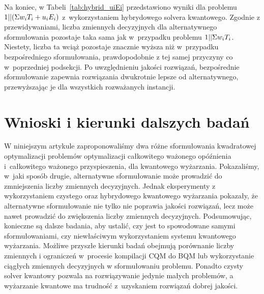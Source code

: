 Na koniec, w Tabeli~\ref{tab:hybrid_uiEi} przedstawiono wyniki dla problemu $1||(\Sigma{}w_i T_i+u_i E_i)$ z~wykorzystaniem hybrydowego solvera kwantowego. Zgodnie z przewidywaniami, liczba zmiennych decyzyjnych dla alternatywnego sformułowania pozostaje taka sama jak w~przypadku problemu $1||\Sigma{}w_i T_i$. Niestety, liczba ta wciąż pozostaje znacznie wyższa niż w~przypadku bezpośredniego sformułowania, prawdopodobnie z tej samej przyczyny co w~poprzedniej podsekcji. Po uwzględnieniu jakości rozwiązań, bezpośrednie sformułowanie zapewnia rozwiązania dwukrotnie lepsze od alternatywnego, przewyższając je dla wszystkich rozważanych instancji.

\section{Wnioski i kierunki dalszych badań}\label{sec:conclusions}

W niniejszym artykule zaproponowaliśmy dwa różne sformułowania kwadratowej optymalizacji problemów optymalizacji całkowitego ważonego opóźnienia i~całkowitego ważonego przyspieszenia, dla kwantowego wyżarzania. Pokazaliśmy, w~jaki sposób drugie, alternatywne sformułowanie może prowadzić do zmniejszenia liczby zmiennych decyzyjnych. Jednak eksperymenty z wykorzystaniem czystego oraz hybrydowego kwantowego wyżarzania pokazały, że alternatywne sformułowanie nie tylko nie poprawia jakości rozwiązań, lecz może nawet prowadzić do zwiększenia liczby zmiennych decyzyjnych. Podsumowując, konieczne są dalsze badania, aby ustalić, czy jest to spowodowane samymi sformułowaniami, czy niewłaściwym wykorzystaniem systemu kwantowego wyżarzania. Możliwe przyszłe kierunki badań obejmują porównanie liczby zmiennych i ograniczeń w~procesie kompilacji CQM do BQM lub wykorzystanie ciągłych zmiennych decyzyjnych w sformułowaniu problemu. Ponadto czysty solver kwantowy pozwala na rozwiązywanie jedynie małych problemów, a wyżarzanie kwantowe ma trudność z~uzyskaniem rozwiązań dobrej jakości.

